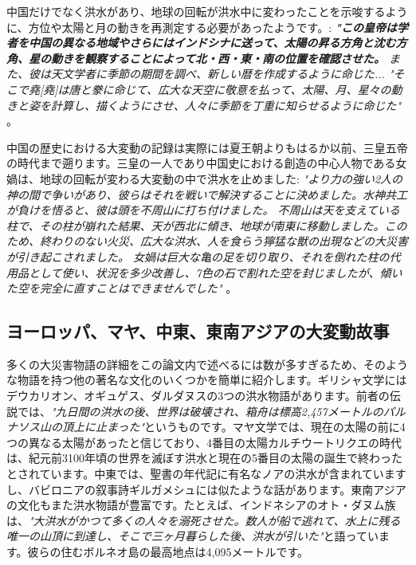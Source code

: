 \documentclass[10pt,twocolumn,letterpaper]{article}
\begin{document}
中国だけでなく洪水があり、地球の回転が洪水中に変わったことを示唆するように、方位や太陽と月の動きを再測定する必要があったようです。: \textit{\textbf{"この皇帝は学者を中国の異なる地域やさらにはインドシナに送って、太陽の昇る方角と沈む方角、星の動きを観察することによって北・西・東・南の位置を確認させた。} また、彼は天文学者に季節の期間を調べ、新しい暦を作成するように命じた... "そこで堯[堯]は唐と豢に命じて、広大な天空に敬意を払って、太陽、月、星々の動きと姿を計算し、描くようにさせ、人々に季節を丁重に知らせるように命じた"} \cite{5}。

中国の歴史における大変動の記録は実際には夏王朝よりもはるか以前、三皇五帝の時代まで遡ります\cite{7}。三皇の一人であり中国史における創造の中心人物である女媧は、地球の回転が変わる大変動の中で洪水を止めました: \textit{"より力の強い2人の神の間で争いがあり、彼らはそれを戦いで解決することに決めました。水神共工が負けを悟ると、彼は頭を不周山に打ち付けました。 不周山は天を支えている柱で、その柱が崩れた結果、天が西北に傾き、地球が南東に移動しました。このため、終わりのない火災、広大な洪水、人を食らう獰猛な獣の出現などの大災害が引き起こされました。 女媧は巨大な亀の足を切り取り、それを倒れた柱の代用品として使い、状況を多少改善し、7色の石で割れた空を封じましたが、傾いた空を完全に直すことはできませんでした"} \cite{8}。

\subsection{ヨーロッパ、マヤ、中東、東南アジアの大変動故事}

多くの大災害物語の詳細をこの論文内で述べるには数が多すぎるため、そのような物語を持つ他の著名な文化のいくつかを簡単に紹介します。ギリシャ文学にはデウカリオン、オギュゲス、ダルダヌスの3つの洪水物語があります\cite{9,10}。前者の伝説では、\textit{"九日間の洪水の後、世界は破壊され、箱舟は標高2,457メートルのパルナソス山の頂上に止まった"}というものです\cite{11}。マヤ文学では、現在の太陽の前に4つの異なる太陽があったと信じており、4番目の太陽カルチウートリクエの時代は、紀元前3100年頃の世界を滅ぼす洪水と現在の5番目の太陽の誕生で終わったとされています\cite{12}。中東では、聖書の年代記に有名なノアの洪水が含まれていますし、バビロニアの叙事詩ギルガメシュには似たような話があります\cite{13}。東南アジアの文化もまた洪水物語が豊富です。たとえば、インドネシアのオト・ダヌム族は、\textit{"大洪水がかつて多くの人々を溺死させた。数人が船で逃れて、水上に残る唯一の山頂に到達し、そこで三ヶ月暮らした後、洪水が引いた"}と語っています\cite{3}。彼らの住むボルネオ島の最高地点は4,095メートルです。
\end{document}
